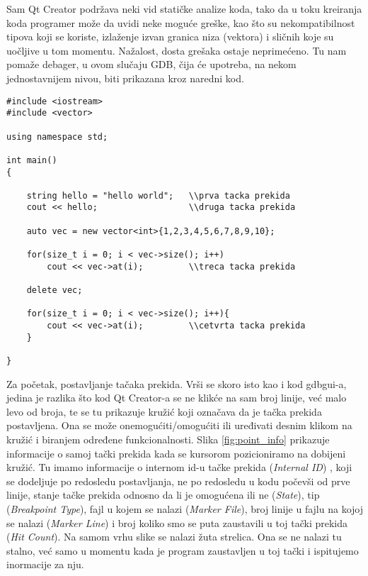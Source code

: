 \documentclass[a4paper]{article}
\begin{document}
Sam Qt Creator podržava neki vid statičke analize koda, tako da u toku kreiranja koda programer može da 
uvidi neke moguće greške, kao što su nekompatibilnost tipova koji se koriste, izlaženje izvan granica niza (vektora) 
i sličnih koje su uočljive u tom momentu. Nažalost, dosta grešaka ostaje neprimećeno. Tu nam pomaže debager,
u ovom slučaju GDB, čija će upotreba, na nekom jednostavnijem nivou, biti prikazana kroz naredni kod. 

\begin{lstlisting}[caption={Primer jednostavnog programa za prikaz rada GDB-a u Qt Creator-u},frame=single, label=simple]
#include <iostream>
#include <vector>

using namespace std;

int main()
{

    string hello = "hello world";   \\prva tacka prekida
    cout << hello;                  \\druga tacka prekida

    auto vec = new vector<int>{1,2,3,4,5,6,7,8,9,10};

    for(size_t i = 0; i < vec->size(); i++)
        cout << vec->at(i);         \\treca tacka prekida

    delete vec;

    for(size_t i = 0; i < vec->size(); i++){
        cout << vec->at(i);         \\cetvrta tacka prekida
    }

}
\end{lstlisting}

Za početak, postavljanje tačaka prekida. Vrši se skoro isto kao i kod gdbgui-a, jedina je razlika što kod Qt Creator-a
se ne klikće na sam broj linije, već malo levo od broja, te se tu prikazuje kružić koji označava da je
tačka prekida postavljena. Ona se može onemogućiti/omogućiti ili uređivati desnim klikom na kružić i biranjem određene funkcionalnosti.
Slika \ref{fig:point_info} prikazuje informacije o samoj tački prekida kada se
kursorom pozicioniramo na dobijeni kružić. Tu imamo informacije o internom id-u tačke prekida (\textit{Internal ID}) , koji se dodeljuje
po redosledu postavljanja, ne po redosledu u kodu počevši od prve linije, stanje tačke prekida
odnosno da li je omogućena ili ne (\textit{State}), tip (\textit{Breakpoint Type}),
fajl u kojem se nalazi (\textit{Marker File}), broj linije u fajlu na kojoj se nalazi (\textit{Marker Line})
i broj koliko smo se puta zaustavili u toj tački prekida (\textit{Hit Count}).
Na samom vrhu slike se nalazi žuta strelica. Ona se ne nalazi tu stalno, već samo u momentu kada je program 
zaustavljen u toj tački i ispitujemo inormacije za nju.
\end{document}
